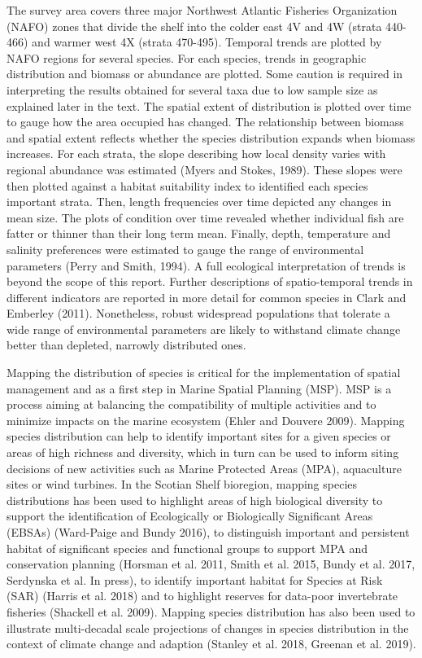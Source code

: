 \documentclass[12pt]{article}\usepackage[]{graphicx}\usepackage[]{color}
\begin{document}
The survey area covers three major Northwest Atlantic Fisheries Organization (NAFO) zones that divide the shelf into the colder east 4V and 4W (strata 440-466) and warmer west 4X (strata 470-495). Temporal trends are plotted by NAFO regions for several species. For each species, trends in geographic distribution and biomass or abundance are plotted. Some caution is required in interpreting the results obtained for several taxa due to low sample size as explained later in the text. The spatial extent of distribution is plotted over time to gauge how the area occupied has changed. The relationship between biomass and spatial extent reflects whether the species distribution expands when biomass increases. For each strata, the slope describing how local density varies with regional abundance was estimated (Myers and Stokes, 1989). These slopes were then plotted against a habitat suitability index to identified each species important strata. Then, length frequencies over time depicted any changes in mean size. The plots of condition over time revealed whether individual fish are fatter or thinner than their long term mean. Finally, depth, temperature and salinity preferences were estimated to gauge the range of environmental parameters (Perry and Smith, 1994). A full ecological interpretation of trends is beyond the scope of this report. Further descriptions of spatio-temporal trends in diﬀerent indicators are reported in more detail for common species in Clark and Emberley (2011). Nonetheless, robust widespread populations that tolerate a wide range of environmental parameters are likely to withstand climate change better than depleted, narrowly distributed ones.

Mapping the distribution of species is critical for the implementation of spatial management and as a first step in Marine Spatial Planning (MSP). MSP is a process aiming at balancing the compatibility of multiple activities and to minimize impacts on the marine ecosystem (Ehler and Douvere 2009). Mapping species distribution can help to identify important sites for a given species or areas of high richness and diversity, which in turn can be used to inform siting decisions of new activities such as Marine Protected Areas (MPA), aquaculture sites or wind turbines. In the Scotian Shelf bioregion, mapping species distributions has been used to highlight areas of high biological diversity to support the identification of Ecologically or Biologically Significant Areas (EBSAs) (Ward-Paige and Bundy 2016), to distinguish important and persistent habitat of significant species and functional groups to support MPA and conservation planning (Horsman et al. 2011, Smith et al. 2015, Bundy et al. 2017, Serdynska et al. In press), to identify important habitat for Species at Risk (SAR) (Harris et al. 2018) and to highlight reserves for data-poor invertebrate fisheries (Shackell et al. 2009). Mapping species distribution has also been used to illustrate multi-decadal scale projections of changes in species distribution in the context of climate change and adaption (Stanley et al. 2018, Greenan et al. 2019).
\end{document}

